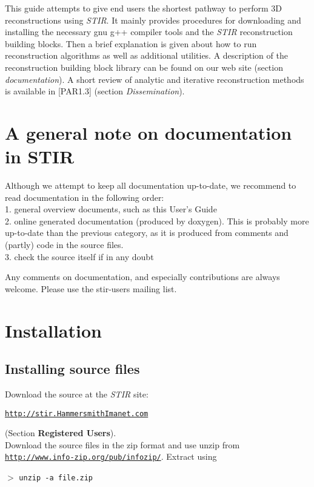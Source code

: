 \documentclass{article}
\def\R2Lurl#1#2{\mbox{\href{#1}{\tt #2}}}
\newcommand{\tab}{\hspace{5mm}}
\newcommand{\cmdline}[1]{\par \noindent $>$ \texttt{#1}\par}
\begin{document}
This guide attempts to give end users the shortest pathway to 
perform 3D reconstructions using \textit{STIR}. It mainly provides 
procedures for downloading and installing the necessary gnu g++ 
compiler tools and the \textit{STIR} reconstruction building blocks. 
Then a brief explanation is given about how to run reconstruction 
algorithms as well as additional utilities. A description of 
the reconstruction building block library can be found on our 
web site (section \textit{documentation}). A short review of analytic 
and iterative reconstruction methods is available in [PAR1.3] 
(section \textit{Dissemination}).

\section{
A general note on documentation in STIR}

Although we attempt to keep all documentation up-to-date, we 
recommend to read documentation in the following order:\\
1.\tab 
general overview documents, such as this User's Guide\\
2.\tab 
online generated documentation (produced by doxygen). This is 
probably more up-to-date than the previous category, as it is 
produced from comments and (partly) code in the source files.\\
3.\tab 
check the source itself if in any doubt


Any comments on documentation, and especially contributions are 
always welcome. Please use the stir-users mailing list.

\section{
Installation}

\subsection{
Installing source files}

Download the source at the \textit{STIR} site: 
\begin{center}
\R2Lurl{http://stir.HammersmithImanet.com }{http://stir.HammersmithImanet.com} 
\end{center}
\noindent (Section \textbf{Registered Users}).\\
Download the source files in the zip format and use unzip from \\
\R2Lurl{http://www.info-zip.org/pub/infozip/}{http://www.info-zip.org/pub/infozip/}. 
Extract using
\cmdline{unzip -a file.zip}
\end{document}
